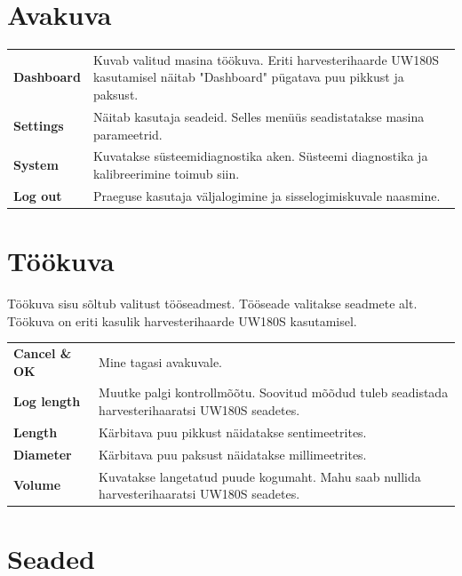 \documentclass[12pt,a4paper,english]{uvmanual}
\begin{document}
\chapter{Avakuva}\label{ch:home}


\begin{tabular}{ L{0.2\textwidth} L{0.66\textwidth} }
\textbf{Dashboard} & Kuvab valitud masina töökuva. Eriti harvesterihaarde UW180S kasutamisel näitab "Dashboard" pügatava puu pikkust ja paksust. \\
\textbf{Settings} & Näitab kasutaja seadeid. Selles menüüs seadistatakse masina parameetrid.  \\
\textbf{System} & Kuvatakse süsteemidiagnostika aken. Süsteemi diagnostika ja kalibreerimine toimub siin.  \\
\textbf{Log out} & Praeguse kasutaja väljalogimine ja sisselogimiskuvale naasmine.  \\
\end{tabular}



\chapter{Töökuva}\label{ch:dashboard}

Töökuva sisu sõltub valitust tööseadmest. Tööseade valitakse seadmete alt. Töökuva on eriti kasulik harvesterihaarde UW180S kasutamisel.


\begin{tabular}{ L{0.2\textwidth} L{0.66\textwidth} }
\textbf{Cancel \& OK} & Mine tagasi avakuvale. \\
\textbf{Log length} & Muutke palgi kontrollmõõtu. Soovitud mõõdud tuleb seadistada harvesterihaaratsi UW180S seadetes. \\
\textbf{Length} & Kärbitava puu pikkust näidatakse sentimeetrites. \\
\textbf{Diameter} & Kärbitava puu paksust näidatakse millimeetrites. \\
\textbf{Volume} & Kuvatakse langetatud puude kogumaht. Mahu saab nullida harvesterihaaratsi UW180S seadetes.  \\
\end{tabular}


\chapter{Seaded}\label{ch:settings}
\end{document}

